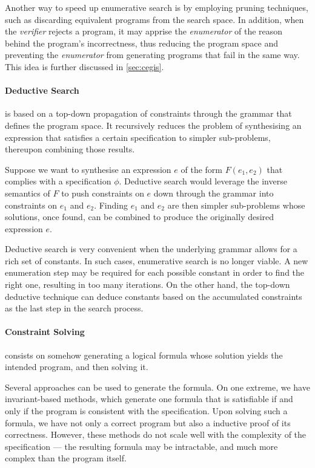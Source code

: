 Another way to speed up enumerative search is by employing pruning techniques, such as discarding equivalent programs from the search space.
In addition, when the \textit{verifier} rejects a program, it may apprise the \textit{enumerator} of the reason behind the program's incorrectness, thus reducing the program space and preventing the \textit{enumerator} from generating programs that fail in the same way.
This idea is further discussed in \autoref{sec:cegis}.

\paragraph{Deductive Search} \cite{DBLP:conf/oopsla/PolozovG15} is based on a top-down propagation of constraints through the grammar that defines the program space. It recursively reduces the problem of synthesising an expression that satisfies a certain specification to simpler sub-problems, thereupon combining those results.

Suppose we want to synthesise an expression \(e\) of the form \(F(e_1, e_2)\) that complies with a specification \(\phi\). Deductive search would leverage the inverse semantics of \(F\) to push constraints on \(e\) down through the grammar into constraints on \(e_1\) and \(e_2\). Finding \(e_1\) and \(e_2\) are then simpler sub-problems whose solutions, once found, can be combined to produce the originally desired expression \(e\).

Deductive search is very convenient when the underlying grammar allows for a rich set of constants. In such cases, enumerative search is no longer viable. A new enumeration step may be required for each possible constant in order to find the right one, resulting in too many iterations. On the other hand, the top-down deductive technique can deduce constants based on the accumulated constraints as the last  step in the search process.

\paragraph{Constraint Solving} \cite{Solar-LezamaPhDThesis,DBLP:conf/popl/SrivastavaGF10} consists on somehow generating a logical formula whose solution yields the intended program, and then solving it.

Several approaches can be used to generate the formula. On one extreme, we have invariant-based methods, which generate one formula that is satisfiable if and only if the program is consistent with the specification. Upon solving such a formula, we have not only a correct program but also a inductive proof of its correctness.
However, these methods do not scale well with the complexity of the specification --- the resulting formula may be intractable, and much more complex than the program itself.

